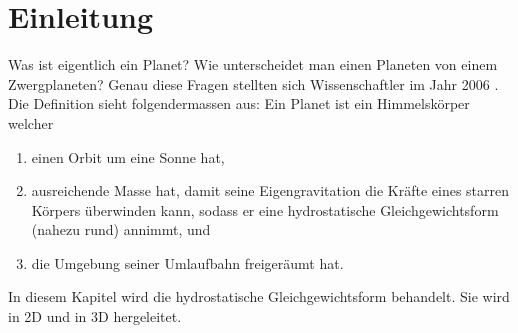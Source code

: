%
%
%
%
\section{Einleitung\label{planet:section:einleitung}}
Was ist eigentlich ein Planet?
Wie unterscheidet man einen Planeten von einem Zwergplaneten?
Genau diese Fragen stellten sich Wissenschaftler im Jahr 2006 \cite{planet:iaub5}.
Die Definition sieht folgendermassen aus:
Ein Planet ist ein Himmelskörper welcher
\begin{enumerate}
	\item einen Orbit um eine Sonne hat,
	\item ausreichende Masse hat, damit seine Eigengravitation die Kräfte eines starren Körpers überwinden kann, sodass er eine hydrostatische Gleichgewichtsform (nahezu rund) annimmt, und
	\item die Umgebung seiner Umlaufbahn freigeräumt hat.
\end{enumerate}

\noindent
In diesem Kapitel wird die hydrostatische Gleichgewichtsform behandelt.
Sie wird in 2D und in 3D hergeleitet.


